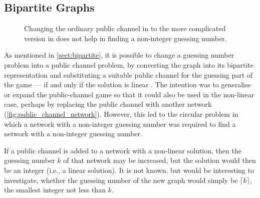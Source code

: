 \subsection{Bipartite Graphs}

\begin{figure}[ht]
     \centering
     \hspace{.3in}

		 \caption[Public-channel problems with different types of channel]{Changing the ordinary public channel in  to the more complicated version in  does not help in finding a non-integer guessing number.}
\end{figure}

As mentioned in \autoref{sect:bipartite}, it is possible to change a guessing number problem into a public channel problem, by converting the graph into its bipartite representation and substituting a suitable public channel for the guessing part of the game --- if and only if the solution is linear \cite{riis2005util}. The intention was to generalise or expand the public-channel game so that it could also be used in the non-linear case, perhaps by replacing the public channel with another network (\autoref{fig:public_channel_network}). However, this led to the circular problem in which a network with a non-integer guessing number was required to find a network with a non-integer guessing number.

If a public channel is added to a network with a non-linear solution, then the guessing number $k$ of that network may be increased, but the solution would then be an integer (i.e., a linear solution). It is not known, but would be interesting to investigate, whether the guessing number of the new graph would simply be $\lceil k \rceil$, the smallest integer not less than $k$.

